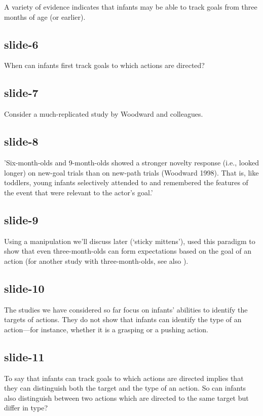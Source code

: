 \documentclass[12pt,\papersize]{extarticle}
\begin{document}
A variety of evidence indicates that 
infants may be able to track goals from three months of age (or earlier).
 
\subsection{slide-6}
When can infants first track goals to which actions are directed?
 
\subsection{slide-7}
Consider a much-replicated study by Woodward and colleagues.
 
\subsection{slide-8}
'Six-month-olds and 9-month-olds showed a stronger novelty response (i.e., looked longer) on new-goal trials than on new-path trials (Woodward 1998). That is, like toddlers, young infants selectively attended to and remembered the features of the event that were relevant to the actor’s goal.'
\citep[p.\ 153]{woodward:2001_making}
 
\subsection{slide-9}
Using a manipulation we’ll discuss later (‘sticky mittens’),
\citet{sommerville:2005_action} used this paradigm to show that even
three-month-olds can form expectations based on the goal of an action
(for another study with three-month-olds, see also \citealp{luo:2011_threemonthold}).
 
\subsection{slide-10}
The studies we have considered so far focus on infants’ abilities to identify the targets of actions.
They do not show that infants can identify the type of an action---for instance, whether it is a grasping or a pushing action.
 
\subsection{slide-11}
To say that infants can track  goals to which actions are directed implies that they can distinguish both the target and the type of an action.
So can infants also distinguish between two actions which are directed to the same target but differ in type?
 
\end{document}
